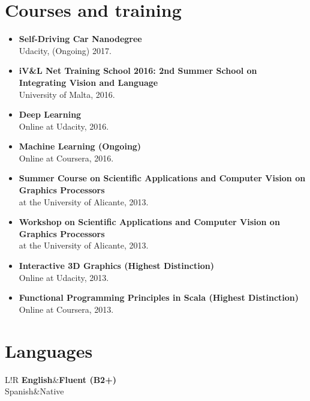 \documentclass[8pt]{article}
\newcommand\VRule{\color{lightgray}\vrule width 0.5pt}
\begin{document}
\section*{Courses and training}

\begin{itemize}
	\item \textbf{Self-Driving Car Nanodegree}\\ Udacity, (Ongoing) 2017.
	\item \textbf{iV\&L Net Training School 2016: 2nd Summer School on Integrating Vision and Language}\\ University of Malta, 2016.
	\item \textbf{Deep Learning}\\ Online at Udacity, 2016.
	\item \textbf{Machine Learning (Ongoing)}\\ Online at Coursera, 2016.
	\item \textbf{Summer Course on Scientific Applications and Computer Vision on Graphics Processors}\\ at the University of Alicante, 2013.
	\item \textbf{Workshop on Scientific Applications and Computer Vision on Graphics Processors}\\ at the University of Alicante, 2013.	
	\item \textbf{Interactive 3D Graphics (Highest Distinction)}\\
	Online at Udacity, 2013.
	\item \textbf{Functional Programming Principles in Scala (Highest Distinction)}\\
	Online at Coursera, 2013.
\end{itemize}

\section*{Languages}
\begin{tabular}{L!{\VRule}R}
{\bf English}&{\bf Fluent (B2+)}\\
{Spanish}&{Native}\\
\end{tabular}

\clearpage
\end{document}
